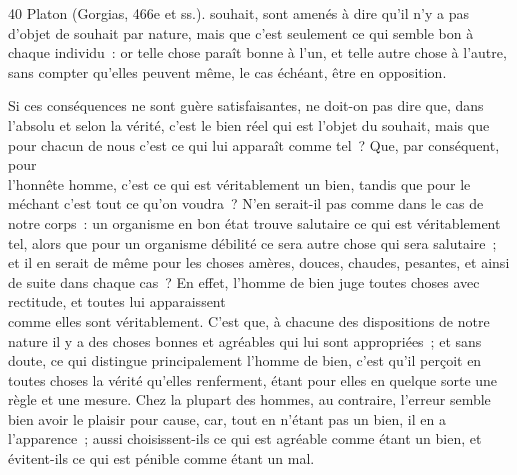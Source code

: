\documentclass[french,twoside]{book} %
\begin{document}
40 Platon (Gorgias, 466e et ss.). souhait, sont amenés à dire qu’il n’y a pas d’objet de souhait par nature, mais que c’est seulement ce qui semble bon à chaque individu : or telle chose paraît bonne à l’un, et telle autre chose à l’autre, sans compter qu’elles peuvent même, le cas échéant, être en opposition.\par
Si ces conséquences ne sont guère satisfaisantes, ne doit-on pas dire que, dans l’absolu et selon la vérité, c’est le bien réel qui est l’objet du souhait, mais que pour chacun de nous c’est ce qui lui apparaît comme tel ? Que, par conséquent, pour \\
l’honnête homme, c’est ce qui est véritablement un bien, tandis que pour le méchant c’est tout ce qu’on voudra ? N’en serait-il pas comme dans le cas de notre corps : un organisme en bon état trouve salutaire ce qui est véritablement tel, alors que pour un organisme débilité ce sera autre chose qui sera salutaire ; et il en serait de même pour les choses amères, douces, chaudes, pesantes, et ainsi de suite dans chaque cas ? En effet, l’homme de bien juge toutes choses avec rectitude, et toutes lui apparaissent \\
comme elles sont véritablement. C’est que, à chacune des dispositions de notre nature il y a des choses bonnes et agréables qui lui sont appropriées ; et sans doute, ce qui distingue principalement l’homme de bien, c’est qu’il perçoit en toutes choses la vérité qu’elles renferment, étant pour elles en quelque sorte une règle et une mesure. Chez la plupart des hommes, au contraire, l’erreur semble bien avoir le plaisir pour cause, car, tout en n’étant pas un bien, il en a l’apparence ;  aussi choisissent-ils ce qui est agréable comme étant un bien, et évitent-ils ce qui est pénible comme étant un mal.
\end{document}
